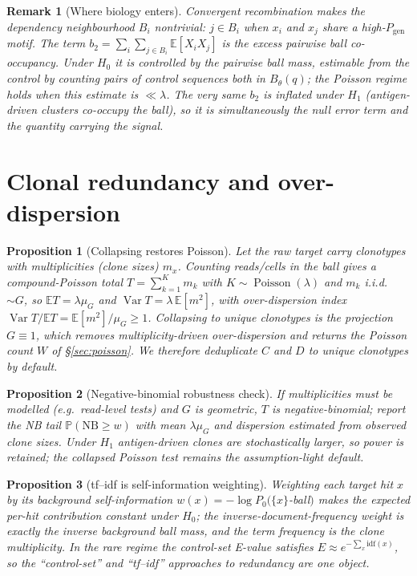 \documentclass[11pt]{article}
\theoremstyle{oldplain}
\newtheorem{proposition}{Proposition}
\theoremstyle{oldrem}
\newtheorem{remark}{Remark}
\DeclareMathOperator{\Poisson}{Poisson}
\DeclareMathOperator{\Var}{Var}
\newcommand{\Pgen}{P_{\mathrm{gen}}}
\newcommand{\Pzero}{P_{0}}
\newcommand{\ball}[2]{B_{#1}(#2)}
\newcommand{\E}{\mathbb{E}}
\newcommand{\Prob}{\mathbb{P}}
\begin{document}
\begin{remark}[Where biology enters]
Convergent recombination makes the dependency neighbourhood $B_i$ nontrivial: $j\in B_i$ when $x_i$
and $x_j$ share a high-$\Pgen$ motif. The term $b_2=\sum_i\sum_{j\in B_i}\E[X_iX_j]$ is the excess
\emph{pairwise} ball co-occupancy. Under $H_0$ it is controlled by the pairwise ball mass, estimable
from the control by counting \emph{pairs} of control sequences both in $\ball{\theta}{q}$; the
Poisson regime holds when this estimate is $\ll\lambda$. The very same $b_2$ is inflated under $H_1$
(antigen-driven clusters co-occupy the ball), so it is simultaneously the null error term and the
quantity carrying the signal.
\end{remark}

\section{Clonal redundancy and over-dispersion}\label{sec:overdispersion}

\begin{proposition}[Collapsing restores Poisson]\label{prop:collapse}
Let the raw target carry clonotypes with multiplicities (clone sizes) $m_x$. Counting reads/cells in
the ball gives a compound-Poisson total $T=\sum_{k=1}^{K} m_k$ with $K\sim\Poisson(\lambda)$ and
$m_k$ i.i.d.\ $\sim G$, so $\E T=\lambda\mu_G$ and $\Var T=\lambda\,\E[m^2]$, with over-dispersion
index $\Var T/\E T=\E[m^2]/\mu_G\ge 1$. Collapsing to unique clonotypes is the projection $G\equiv1$,
which removes multiplicity-driven over-dispersion and returns the Poisson count $W$ of
\S\ref{sec:poisson}. We therefore deduplicate $C$ and $D$ to unique clonotypes by default.
\end{proposition}

\begin{proposition}[Negative-binomial robustness check]\label{prop:nb}
If multiplicities must be modelled (e.g.\ read-level tests) and $G$ is geometric, $T$ is
negative-binomial; report the NB tail $\Prob(\mathrm{NB}\ge w)$ with mean $\lambda\mu_G$ and
dispersion estimated from observed clone sizes. Under $H_1$ antigen-driven clones are stochastically
larger, so power is retained; the collapsed Poisson test remains the assumption-light default.
\end{proposition}

\begin{proposition}[tf--idf is self-information weighting]\label{prop:tfidf}
Weighting each target hit $x$ by its background self-information $w(x) = -\log\Pzero(\{x\}$-ball$)$
makes the expected per-hit contribution constant under $H_0$; the inverse-document-frequency weight
is exactly the inverse background ball mass, and the term frequency is the clone multiplicity. In the
rare regime the control-set E-value satisfies $E \approx e^{-\sum_{x} \mathrm{idf}(x)}$, so the
``control-set'' and ``tf--idf'' approaches to redundancy are one object.
\end{proposition}
\end{document}

